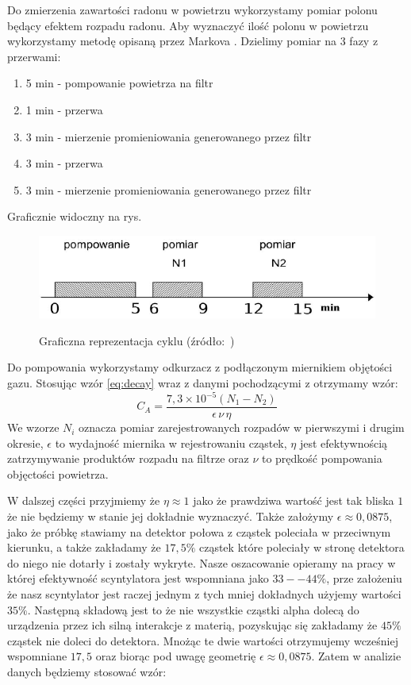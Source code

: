\documentclass[12pt]{article}
\begin{document}
Do zmierzenia zawartości radonu w powietrzu wykorzystamy pomiar polonu będący efektem rozpadu radonu. Aby wyznaczyć ilość polonu w powietrzu wykorzystamy metodę opisaną przez Markova \cite{equation}. Dzielimy pomiar na 3 fazy z przerwami:
\begin{enumerate}
	\item 5 min - pompowanie powietrza na filtr
	\item 1 min - przerwa
	\item 3 min - mierzenie promieniowania generowanego przez filtr
	\item 3 min - przerwa
	\item 3 min - mierzenie promieniowania generowanego przez filtr
\end{enumerate}
Graficznie widoczny na rys.
\begin{figure}[H]
	\centering
	\includegraphics[scale=0.7]{cycle}
	\label{fig:cycle}
	\caption{Graficzna reprezentacja cyklu (źródło:~\cite{skrypt})}
\end{figure}
Do pompowania wykorzystamy odkurzacz z podłączonym miernikiem objętości gazu.
Stosując wzór \eqref{eq:decay} wraz z danymi pochodzącymi z \cite{skrypt} otrzymamy wzór:
\[
	C_A = \frac{7{,}3 \times 10^{-5} (N_1 - N_2)}{\epsilon \, \nu \, \eta}
\]
We wzorze $N_i$ oznacza pomiar zarejestrowanych rozpadów w pierwszymi i drugim okresie, $\epsilon$ to wydajność miernika w rejestrowaniu cząstek, $\eta$ jest efektywnością zatrzymywanie produktów rozpadu na filtrze oraz $\nu$ to prędkość pompowania objęctości powietrza.

W dalszej części przyjmiemy że $\eta \approx 1$ jako że prawdziwa wartość jest tak bliska $1$ że nie będziemy w stanie jej dokładnie wyznaczyć. Także założymy $\epsilon \approx 0{,}0875$, jako że próbkę stawiamy na detektor połowa z cząstek poleciała w przeciwnym kierunku, a także zakładamy że $17{,}5\%$ cząstek które poleciały w stronę detektora do niego nie dotarły i zostały wykryte. Nasze oszacowanie opieramy na pracy \cite{scynt} w której efektywność scyntylatora jest wspomniana jako $33--44\%$, prze założeniu że nasz scyntylator jest raczej jednym z tych mniej dokładnych użyjemy wartości $35\%$. Następną składową jest to że nie wszystkie cząstki alpha dolecą do urządzenia przez ich silną interakcje z materią, pozyskując się \cite{alpha_range} zakładamy że $45\%$ cząstek nie doleci do detektora. Mnożąc te dwie wartości otrzymujemy wcześniej wspomniane $17{,}5$ oraz biorąc pod uwagę geometrię $\epsilon \approx 0{,}0875$. Zatem w analizie danych będziemy stosować wzór:
\end{document}
